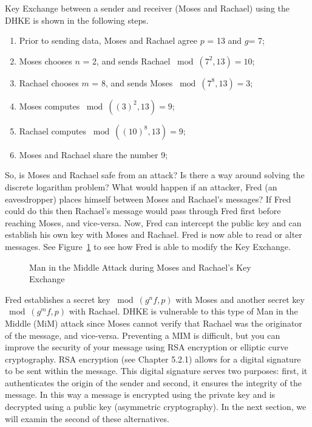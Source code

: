 \begin{eg} Key Exchange between a sender and receiver (Moses and Rachael) using the DHKE is shown in the following steps.
\begin{enumerate}[Step 1.]
\item Prior to sending data, Moses and Rachael agree $p$ = 13 and $g$= 7; 
\item Moses chooses $n$ = 2, and sends Rachael $\bmod (7^2 , 13) = 10$;
\item Rachael chooses $m$ = 8, and sends Moses $\bmod (7^8  , 13) = 3 $;
\item Moses computes $\bmod ((3)^2 , 13 ) = 9$;
\item Rachael computes $\bmod ((10)^8 , 13 ) = 9$;
\item Moses and Rachael share the number 9;
\end{enumerate}
\end{eg}

So, is Moses and Rachael safe from an attack?  Is there a way around solving the discrete logarithm problem?  What would happen if an attacker, Fred (an eavesdropper) places himself between Moses and Rachael's messages?  If Fred could do this then Rachael's message would pass through Fred first before reaching Moses, and vice-versa. Now, Fred can intercept the public key and can establish his own key with Moses and Rachael.  Fred is now able to read or alter messages.  See Figure~\ref{fig:DH:DHKE_2} to see how Fred is able to modify the Key Exchange.
\begin{figure}[H]
	  \caption{\label{fig:DH:DHKE_2} Man in the Middle Attack during Moses and Rachael's Key Exchange }
\end{figure}

Fred establishes a secret key $\bmod ( g^nf, p)$ with Moses and another secret key $\bmod ( g^mf, p)$ with Rachael.  DHKE is vulnerable to this type of Man in the Middle (MiM) attack since Moses cannot verify that Rachael was the originator of the message, and vice-versa.  Preventing a MIM is difficult, but you can improve the security of your message using RSA encryption or elliptic curve cryptography. RSA encryption (see Chapter 5.2.1) allows for a digital signature to be sent within the message. This digital signature serves two purposes: first, it authenticates the origin of the sender and second, it ensures the integrity of the message. In this way a message is encrypted using the private key and is decrypted using a public key (asymmetric cryptography). In the next section, we will examin the second of these alternatives. 

